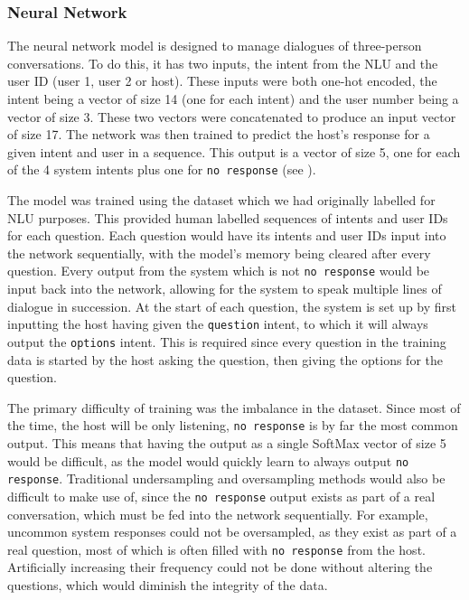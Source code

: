 \documentclass[hidelinks, 11pt]{article}
\begin{document}
\subsubsection{Neural Network}
\label{subsec:nn}
The neural network model is designed to manage dialogues of three-person conversations. To do this, it has two inputs, the intent from the NLU and the user ID (user 1, user 2 or host). These inputs were both one-hot encoded, the intent being a vector of size 14 (one for each intent) and the user number being a vector of size 3. These two vectors were concatenated to produce an input vector of size 17. The network was then trained to predict the host's response for a given intent and user in a sequence. This output is a vector of size 5, one for each of the 4 system intents plus one for \verb|no response| (see ).

The model was trained using the dataset which we had originally labelled for NLU purposes. This provided human labelled sequences of intents and user IDs for each question. Each question would have its intents and user IDs input into the network sequentially, with the model's memory being cleared after every question. Every output from the system which is not \verb|no response| would be input back into the network, allowing for the system to speak multiple lines of dialogue in succession. At the start of each question, the system is set up by first inputting the host having given the \verb|question| intent, to which it will always output the \verb|options| intent. This is required since every question in the training data is started by the host asking the question, then giving the options for the question.

The primary difficulty of training was the imbalance in the dataset. Since most of the time, the host will be only listening, \verb|no response| is by far the most common output. This means that having the output as a single SoftMax vector of size 5 would be difficult, as the model would quickly learn to always output \verb|no response|. Traditional undersampling and oversampling methods would also be difficult to make use of, since the \verb|no response| output exists as part of a real conversation, which must be fed into the network sequentially. For example, uncommon system responses could not be oversampled, as they exist as part of a real question, most of which is often filled with \verb|no response| from the host. Artificially increasing their frequency could not be done without altering the questions, which would diminish the integrity of the data.
\end{document}
